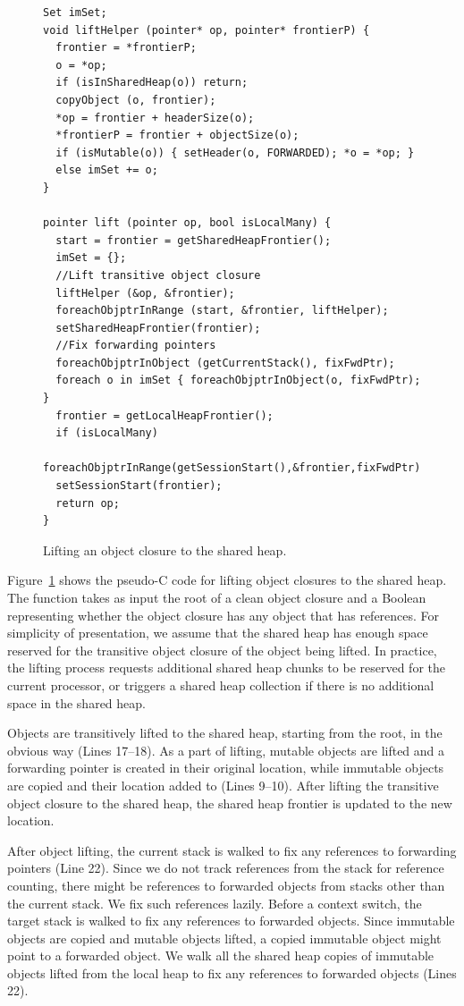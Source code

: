 \begin{figure}[t]
\begin{lstlisting}
Set imSet;
void liftHelper (pointer* op, pointer* frontierP) {
  frontier = *frontierP;
  o = *op;
  if (isInSharedHeap(o)) return;
  copyObject (o, frontier);
  *op = frontier + headerSize(o);
  *frontierP = frontier + objectSize(o);
  if (isMutable(o)) { setHeader(o, FORWARDED); *o = *op; }
  else imSet += o;
}

pointer lift (pointer op, bool isLocalMany) {
  start = frontier = getSharedHeapFrontier();
  imSet = {};
  //Lift transitive object closure
  liftHelper (&op, &frontier);
  foreachObjptrInRange (start, &frontier, liftHelper);
  setSharedHeapFrontier(frontier);
  //Fix forwarding pointers
  foreachObjptrInObject (getCurrentStack(), fixFwdPtr);
  foreach o in imSet { foreachObjptrInObject(o, fixFwdPtr); }
  frontier = getLocalHeapFrontier();
  if (isLocalMany)
    foreachObjptrInRange(getSessionStart(),&frontier,fixFwdPtr);
  setSessionStart(frontier);
  return op;
}
\end{lstlisting}
\caption{Lifting an object closure to the shared heap.}
\label{code:lift}
\end{figure}


Figure~\ref{code:lift} shows the pseudo-C code for lifting object closures to
the shared heap. The function  takes as input the root of a clean
object closure and a Boolean representing whether the object closure has any
object that has  references. For simplicity of presentation, we
assume that the shared heap has enough space reserved for the transitive object
closure of the object being lifted. In practice, the lifting process requests
additional shared heap chunks to be reserved for the current processor, or
triggers a shared heap collection if there is no additional space in the shared
heap.

Objects are transitively lifted to the shared heap, starting from the root, in
the obvious way (Lines 17--18). As a part of lifting, mutable objects are
lifted and a forwarding pointer is created in their original location, while
immutable objects are copied and their location added to  (Lines
9--10). After lifting the transitive object closure to the shared heap, the
shared heap frontier is updated to the new location.

After object lifting, the current stack is walked to fix any references to
forwarding pointers (Line 22). Since we do not track references from the stack
for reference counting, there might be references to forwarded objects from
stacks other than the current stack. We fix such references lazily. Before a
context switch, the target stack is walked to fix any references to forwarded
objects. Since immutable objects are copied and mutable objects lifted, a
copied immutable object might point to a forwarded object. We walk all the
shared heap copies of immutable objects lifted from the local heap to fix any
references to forwarded objects (Lines 22).

